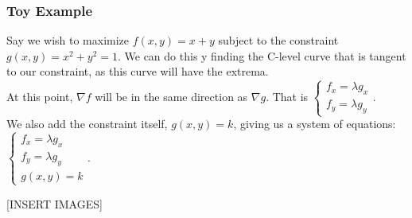 \subsubsection{Toy Example}
\noindent
Say we wish to maximize $f(x,y) = x+y$ subject to the constraint $g(x,y) = x^2 + y^2 = 1$. We can do this y finding the C-level curve that is tangent to our constraint, as this curve will have the extrema.\\
At this point, $\nabla f$ will be in the same direction as $\nabla g$. That is 
$
\begin{cases} 
	f_x = \lambda g_x \\ 
	f_y = \lambda g_y
\end{cases}
$.\\
We also add the constraint itself, $g(x,y) = k$, giving us a system of equations: 
$
\begin{cases}
	f_x = \lambda g_x \\ 
	f_y = \lambda g_y \\ 
	g(x,y)=k 
\end{cases}
$.

[INSERT IMAGES]